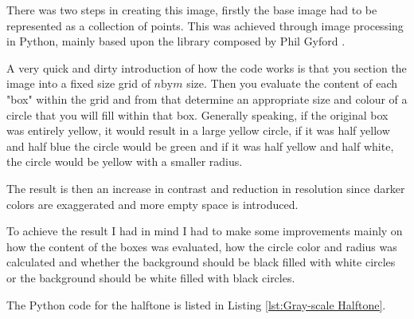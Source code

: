 \documentclass[%
]{USN-MSc}
\begin{document}
There was two steps in creating this image, firstly the base image had to be represented as a collection of points. This was achieved through image processing in Python, mainly based upon the library composed by Phil Gyford \cite{Halftones}. 

A very quick and dirty introduction of how the code works is that you section the image into a fixed size grid of \(n \text{by} m\) size. Then you evaluate the content of each "box" within the grid and from that determine an appropriate size and colour of a circle that you will fill within that box. Generally speaking, if the original box was entirely yellow, it would result in a large yellow circle, if it was half yellow and half blue the circle would be green and if it was half yellow and half white, the circle would be yellow with a smaller radius.

The result is then an increase in contrast and reduction in resolution since darker colors are exaggerated and more empty space is introduced.

To achieve the result I had in mind I had to make some improvements mainly on how the content of the boxes was evaluated, how the circle color and radius was calculated and whether the background should be black filled with white circles or the background should be white filled with black circles.

The Python code for the halftone is listed in Listing \ref{lst:Gray-scale Halftone}.
\end{document}
